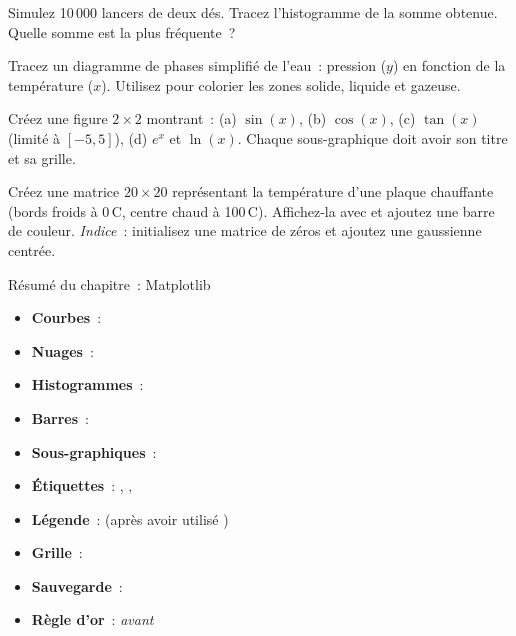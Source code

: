 \begin{exercice}
Simulez 10\,000 lancers de deux d\'es. Tracez l'histogramme de la somme obtenue.
Quelle somme est la plus fr\'equente~?
\end{exercice}

\begin{exercice}
Tracez un diagramme de phases simplifi\'e de l'eau~: pression ($y$) en fonction de
la temp\'erature ($x$). Utilisez  pour colorier les zones
solide, liquide et gazeuse.
\end{exercice}

\begin{exercice}
Cr\'eez une figure $2\times 2$ montrant~: (a) $\sin(x)$, (b) $\cos(x)$,
(c) $\tan(x)$ (limit\'e \`a $[-5, 5]$), (d) $e^x$ et $\ln(x)$.
Chaque sous-graphique doit avoir son titre et sa grille.
\end{exercice}

\begin{exercice}
Cr\'eez une matrice $20\times 20$ repr\'esentant la temp\'erature d'une plaque
chauffante (bords froids \`a 0\,\textdegree C, centre chaud \`a 100\,\textdegree C).
Affichez-la avec  et ajoutez une barre de couleur.
\emph{Indice}~: initialisez une matrice de z\'eros et ajoutez une gaussienne
centr\'ee.
\end{exercice}

\begin{formules}{R\'esum\'e du chapitre~: Matplotlib}
\begin{itemize}
    \item \textbf{Courbes}~: 
    \item \textbf{Nuages}~: 
    \item \textbf{Histogrammes}~: 
    \item \textbf{Barres}~: 
    \item \textbf{Sous-graphiques}~: 
    \item \textbf{\'Etiquettes}~: , , 
    \item \textbf{L\'egende}~:  (apr\`es avoir utilis\'e )
    \item \textbf{Grille}~: 
    \item \textbf{Sauvegarde}~: 
    \item \textbf{R\`egle d'or}~:  \emph{avant} 
\end{itemize}
\end{formules}
